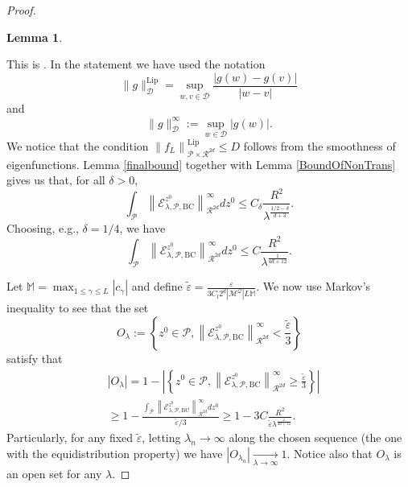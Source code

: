 \documentclass{amsart}
\newtheorem{lemma}[theorem]{Lemma}
\theoremstyle{definition}
\theoremstyle{remark}
\newcommand{\ep}{\varepsilon}
\renewcommand\leq\leqslant
\renewcommand\geq\geqslant
\numberwithin{equation}{section}
\theoremstyle{definition}
\theoremstyle{remark}
\begin{document}
\begin{proof}
\begin{lemma}
	\end{lemma}
	This is \cite[lemma 2.18]{Cann}. In the statement we have used the notation \begin{equation}
		\|g\|_{\mathcal{D}}^{\mathrm{Lip}}=\sup _{w, v \in \mathcal{D}} \frac{|g(w)-g(v)|}{|w-v|}
	\end{equation} and \begin{equation}
	\|g\|_{\mathcal{D}}^{\infty}:=\sup _{w \in \mathcal{D}}|g(w)|.
	\end{equation} We notice that the condition $\left\|f_L\right\|_{\mathcal{P} \times \mathcal{R}^{2d}}^{\mathrm{Lip}} \leq D$ follows from the smoothness of eigenfunctions. Lemma \ref{finalbound} together with Lemma \ref{BoundOfNonTrans} gives us that, for all $\delta>0$,\begin{equation}
		\int_{\mathcal{P}}\left\|\mathcal{E}_{\lambda, \mathcal{P},\mathrm{BC}}^{z^0}\right\|_{\mathcal{R}^{2d}}^{\infty} d z^0 \leq C_\delta \frac{R^{2}}{\lambda^{\frac{1/2-\delta}{d+3}}}.
	\end{equation}
	Choosing, e.g., $\delta=1/4$, we have \begin{equation}
		\int_{\mathcal{P}}\left\|\mathcal{E}_{\lambda,\mathcal{P},\mathrm{BC}}^{z^0}\right\|_{\mathcal{R}^{2d}}^{\infty} d z^0 \leq C \frac{R^{2}}{\lambda^{\frac{1}{4d+12}}}.
	\end{equation}
	
	Let $\mathbb{M}=\max_{1\leq \gamma\leq L}|c_\gamma|$ and define $\tilde{\ep}=\frac{\ep}{3C_l2^d|\mathcal{M}^\mathcal{Q}|L\mathbb{M}}$. We now use Markov's inequality to see that the set 
	\begin{equation}\label{set}
		O_\lambda:=\left\{z^0\in \mathcal{P},\left\|\mathcal{E}_{\lambda,\mathcal{P},\mathrm{BC}}^{z^0}\right\|_{\mathcal{R}^{2d}}^{\infty}<\frac{\tilde{\ep}}{3} \right\}
	\end{equation}
	satisfy that \begin{equation}
		\begin{aligned}
			&\left|O_\lambda\right|=1-\left|\left\{z^0\in \mathcal{P},\left\|\mathcal{E}_{\lambda,\mathcal{P},\mathrm{BC}}^{z^0}\right\|_{\mathcal{R}^{2d}}^{\infty}\geq\frac{\tilde{\ep}}{3} \right\}\right|\\&\geq1-\frac{	\int_{\mathcal{P}}\left\|\mathcal{E}_{\lambda,\mathcal{P},\mathrm{BC}}^{z^0}\right\|_{\mathcal{R}^{2d}}^{\infty} d z^0}{\tilde{\ep}/3}\geq 1-3C \frac{R^{2}}{\tilde{\ep}\lambda^{\frac{1}{4d+12}}}.
		\end{aligned}
	\end{equation} Particularly, for any fixed $\tilde{\ep}$, letting $\lambda_n\rightarrow\infty$ along the chosen sequence (the one with the equidistribution property) we have $\left|O_{\lambda_n}\right|\xrightarrow[\lambda\rightarrow\infty]{}1$. Notice also that $O_\lambda$ is an open set for any $\lambda$. 
    

\end{proof}
\end{document}
